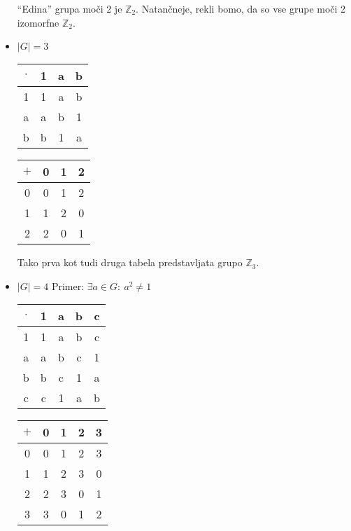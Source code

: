\documentclass[a4paper,12pt]{article}
\begin{document}
\begin{itemize}
``Edina'' grupa moči 2 je $\mathbb{Z}_2$. Natančneje, rekli bomo, da so vse grupe moči 2 izomorfne $\mathbb{Z}_2$. 

\item $|G|=3$

\begin{table}[hpb]
\begin{minipage}[b]{0.45\linewidth}
\centering
\begin{tabular}{c|ccc}
$\cdot$ & 1 & a & b \\
\hline
1 & 1 & a & b \\
a & a & b & 1 \\
b & b & 1 & a \\
\end{tabular}
\end{minipage}
\hspace{0.5cm}
\begin{minipage}[b]{0.45\linewidth}
\centering
\begin{tabular}{c|ccc}
$+$ & 0 & 1 & 2 \\
\hline
0 & 0 & 1 & 2 \\
1 & 1 & 2 & 0 \\
2 & 2 & 0 & 1 \\
\end{tabular}
\end{minipage}
\end{table}

Tako prva kot tudi druga tabela predstavljata grupo $\mathbb{Z}_3$.

\newpage

\item $|G|=4$ Primer: $\exists a \in G:~a^2\neq 1$

\begin{table}[hpb]
\begin{minipage}[b]{0.45\linewidth}
\centering
\begin{tabular}{c|cccc}
$\cdot$ & 1 & a & b & c \\
\hline
1 & 1 & a & b & c \\
a & a & b & c & 1 \\
b & b & c & 1 & a \\
c & c & 1 & a & b \\
\end{tabular}
\end{minipage}
\hspace{0.5cm}
\begin{minipage}[b]{0.45\linewidth}
\centering
\begin{tabular}{c|cccc}
$+$ & 0 & 1 & 2 & 3 \\
\hline
0 & 0 & 1 & 2 & 3 \\
1 & 1 & 2 & 3 & 0 \\
2 & 2 & 3 & 0 & 1 \\
3 & 3 & 0 & 1 & 2 \\
\end{tabular}
\end{minipage}
\end{table}


\end{itemize}
\end{document}
